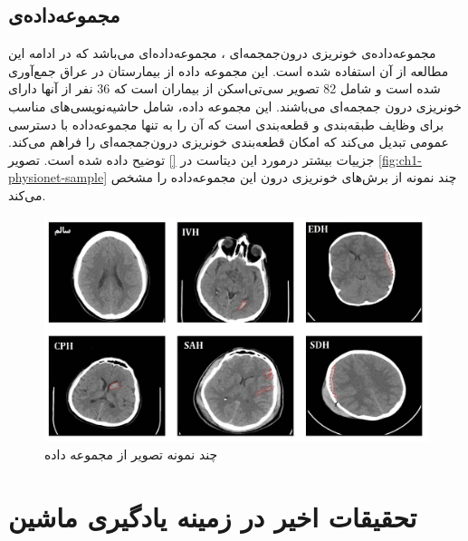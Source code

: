  \subsection{مجموعه‌داده‌ی }
 مجموعه‌داده‌ی خونریزی درون‌جمجمه‌ای 
 \cite{physionet_hssayeni2020intracranial}،
 مجموعه‌داده‌ای می‌باشد که در ادامه این مطالعه از آن استفاده شده است. این مجموعه داده
 از بیمارستان
 در عراق جمع‌آوری شده است و شامل 82 تصویر سی‌تی‌اسکن از بیماران است که 36 نفر از آنها دارای خونریزی درون جمجمه‌ای می‌باشند.
   این مجموعه داده، شامل حاشیه‌نویسی‌های مناسب برای وظایف طبقه‌بندی و قطعه‌بندی است که آن را به تنها مجموعه‌داده با دسترسی عمومی تبدیل می‌کند که امکان قطعه‌بندی خونریزی درون‌جمجمه‌ای را فراهم می‌کند. جزییات بیشتر درمورد این دیتاست در 
   \autoref{}
 توضیح داده شده است.
 تصویر
 \autoref{fig:ch1-physionet-sample}
 چند نمونه از برش‌های خونریزی درون این مجموعه‌داده را مشخص می‌کند.
 \begin{figure}[H]
 \centering
 \includegraphics[width=1.0\linewidth]{"Images/Chapter1/physionet sample"}
 \caption{چند نمونه تصویر از مجموعه داده
 }
 \label{fig:ch1-physionet-sample}
 \end{figure}
 
 
 \section{تحقیقات اخیر در زمینه یادگیری ماشین}
 
